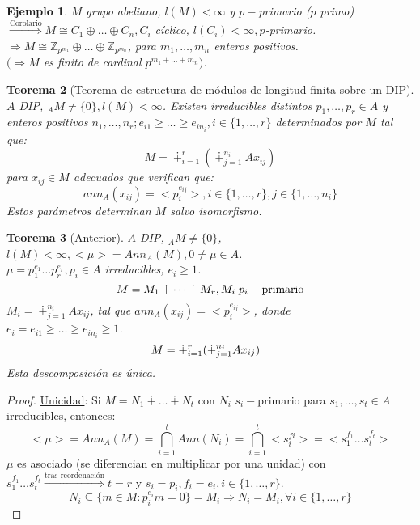 \documentclass[11pt,a4paper]{article}
\theoremstyle{break}
\newtheorem{theorem}{Teorema}[section]
\newtheorem{example}[theorem]{Ejemplo}
\begin{document}
\begin{example}
$M$ grupo abeliano, $l(M) < \infty$ y $p-$primario ($p$ primo) \\
$\overset{\text{Corolario}}{\Rightarrow} M \cong C_{1} \oplus \dots \oplus C_{n}, C_{i}$ cíclico, $l(C_{i}) < \infty, p$-primario. \\
$\Rightarrow M \cong \mathbb{Z}_{p^{m_{1}}} \oplus \dots \oplus \mathbb{Z}_{p^{m_{n}}}$, para $m_{1}, \dots, m_{n}$ enteros positivos. \\
$(\Rightarrow M$ es finito de cardinal $p^{m_{1} + \dots + m_{n}})$.
\end{example}

\begin{theorem}[Teorema de estructura de módulos de longitud finita sobre un DIP]
$A$ DIP, $_{A}M \neq \{0\}, l(M) < \infty$. Existen irreducibles distintos $p_{1}, \dots, p_{r} \in A$ y enteros positivos $n_{1}, \dots, n_{r}; e_{i1} \geq \dots \geq e_{in_{i}}, i \in \{1, \dots, r\}$ determinados por $M$ tal que:
$$M = \dotplus_{i=1}^{r} (\dotplus_{j=1}^{n_{i}} Ax_{ij})$$
para $x_{ij} \in M$ adecuados que verifican que:
$$ann_{A}(x_{ij}) = <p_{i}^{e_{ij}}>, i \in \{1, \dots, r\}, j \in \{1, \dots, n_{i}\}$$
Estos parámetros determinan $M$ salvo isomorfismo.
\end{theorem}


\begin{theorem}[Anterior]
$A$ DIP, $_{A}M \neq \{0\}$, $l(M) < \infty, <\mu> = Ann_{A}(M), 0 \neq \mu \in A$. \\
$\mu = p_{1}^{e_{1}} \dots p_{r}^{e_{r}}, p_{i} \in A$ irreducibles, $e_{i} \geq 1$.
$$M = M_{1} \dotplus \dots \dotplus M_{r}, M_{i} \hspace{0.1cm} p_{i}-\text{primario}$$
$M_{i} = \dotplus_{j=1}^{n_{i}} Ax_{ij}$, tal que $ann_{A} (x_{ij}) = <p_{i}^{e_{ij}}>$, donde \\ $e_{i} = e_{i1} \geq \dots \geq e_{in_{i}} \geq 1$.
$$M = \dotplus_{i=1}^{r} (\dotplus_{j=1}^{n_{i}} Ax_{ij}) \hspace{0.3cm}$$
Esta descomposición es única.
\end{theorem}

\begin{proof}
\underline{Unicidad}: Si $M = N_{1} \dotplus \dots \dotplus N_{t}$ con $N_{i}$ $s_{i}-$primario para $s_{1}, \dots, s_{t} \in A$ irreducibles, entonces:
$$<\mu> = Ann_{A}(M) = \bigcap_{i=1}^{t} Ann(N_{i}) = \bigcap_{i=1}^{t} <s_{i}^{f{i}}> = <s_{1}^{f_{1}} \dots s_{t}^{f_{t}}>$$
$\mu$ es asociado (se diferencian en multiplicar por una unidad) con \\ $s_{1}^{f_{1}} \dots s_{t}^{f_{t}} \overset{\text{tras reordenación}}{\Rightarrow} t=r$ y $s_{i} = p_{i}, f_{i} = e_{i}, i \in \{1, \dots, r\}$.
$$N_{i} \subseteq \{m \in M: p_{i}^{e_{i}}m = 0\} = M_{i} \Rightarrow N_{i} = M_{i}, \forall i \in \{1, \dots, r\}$$
\end{proof}
\end{document}
